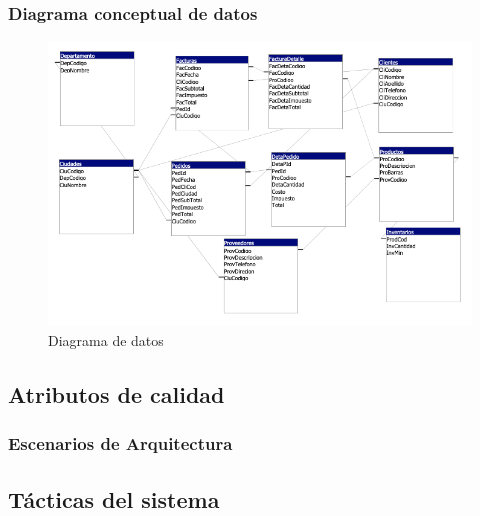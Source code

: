 \documentclass[12pt]{article}
\begin{document}




\subsubsection{Diagrama conceptual de datos}
\begin{figure}[ht]
\centering
\centering
\includegraphics[scale=0.6]{Diagrama de datos.png}
\caption{Diagrama de datos}
\label{2}
\end{figure}
\FloatBarrier






\subsection{Atributos de calidad}


\subsubsection{Escenarios de Arquitectura}











\subsection{Tácticas del sistema}


\end{document}

